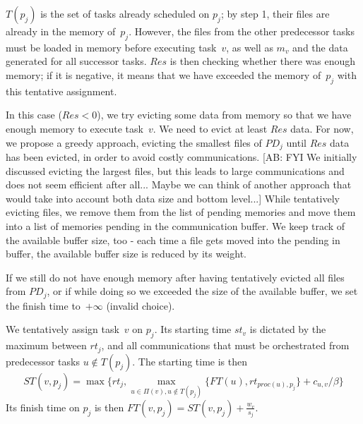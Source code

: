 \documentclass[conference]{IEEEtran}
\newcommand{\PD}{PD}
\newcommand{\AB}[1]{{\color{purple}[AB: #1]}}
\begin{document}
    $T(p_j)$ is the set of tasks already scheduled on $p_j$; by step 1, their files are
    already in the memory of~$p_j$. However, the files from the
    other predecessor tasks must be loaded in memory before executing task~$v$,
    as well as $m_v$ and the data generated for all successor tasks.
    $Res$ is then checking whether there was enough memory; if it is negative,
    it means that we have exceeded the memory of~$p_j$ with this tentative
    assignment.

    In this case ($Res <0$), we try evicting
    some data from memory so that we have enough memory to execute task~$v$.
    We need to evict at least $Res$ data.
    For now, we propose a greedy approach, evicting the smallest files of $\PD_j$ until $Res$ data has been evicted,
    in order to avoid costly communications.
    \AB{FYI We initially discussed evicting the largest files, but this leads to
    large communications and does not seem efficient after all... Maybe we can think of another
    approach that would take into account both data size and bottom level...}
    While tentatively evicting files, we remove them from the list of pending memories and move them into a list
    of memories pending in the communication buffer.
    We keep track of the available buffer size, too - each time a file gets moved into the pending in buffer, the available buffer size is reduced by its weight.

    If we still do not have enough memory after having tentatively evicted all files from $\PD_j$,
    or if while doing so we exceeded the size of the available buffer,
    we set the finish time to~$+\infty$ (invalid choice).

    \smallskip
     We tentatively assign task~$v$ on $p_j$.
    Its starting time $st_v$ is dictated by the maximum between $rt_j$, and all communications that
    must be orchestrated from predecessor tasks $u\notin T(p_j)$.
    The starting time is then
    \[ST(v, p_j) = \max{ \{rt_j, \max_{ u \in \Pi(v), u\notin T(p_j)}\{ FT(u) , rt_{proc(u), p_j}\} + c_{u,v} / \beta \} } \]
    Its finish time on $p_j$ is then
    $FT(v,p_j) = ST(v, p_j) + \frac{w_v}{s_j}$.
\end{document}
